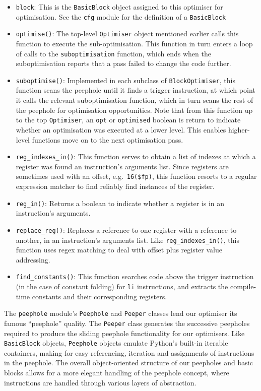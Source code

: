 \begin{itemize}
    \item \texttt{block}: This is the \texttt{BasicBlock} object assigned to
    this optimiser for optimisation. See the \texttt{cfg} module for the
    definition of a \texttt{BasicBlock}
    \item \texttt{optimise()}: The top-level \texttt{Optimiser} object mentioned
    earlier calls this function to execute the sub-optimisation. This function
    in turn enters a loop of calls to the \texttt{suboptimisation} function,
    which ends when the suboptimisation reports that a pass failed to change the
    code further.
    \item \texttt{suboptimise()}: Implemented in each subclass of
    \texttt{BlockOptimiser}, this function scans the peephole until it finds a
    trigger instruction, at which point it calls the relevant suboptimisation
    function, which in turn scans the rest of the peephole for optimisation
    opportunities. Note that from this function up to the top
    \texttt{Optimiser}, an \texttt{opt} or \texttt{optimised} boolean is return
    to indicate whether an optimisation was executed at a lower level. This
    enables higher-level functions move on to the next optimisation pass.
    \item \texttt{reg\_indexes\_in()}: This function serves to obtain a list of
    indexes at which a register was found an instruction's arguments list. Since
    registers are sometimes used with an offset, e.g.\ \texttt{16(\$fp)}, this
    function resorts to a regular expression matcher to find reliably find
    instances of the register.
    \item \texttt{reg\_in()}: Returns a boolean to indicate whether a register is
    in an instruction's arguments.
    \item \texttt{replace\_reg()}: Replaces a reference to one register with a
    reference to another, in an instruction's arguments list. Like
    \texttt{reg\_indexes\_in()}, this function uses regex matching to deal with
    offset plus register value addressing.
    \item \texttt{find\_constants()}: This function searches code above the
    trigger instruction (in the case of constant folding) for \texttt{li}
    instructions, and extracts the compile-time constants and their
    corresponding registers.
\end{itemize}


The \texttt{peephole} module's \texttt{Peephole} and \texttt{Peeper} classes
lend our optimiser its famous ``peephole'' quality. The \texttt{Peeper} class
generates the successive peepholes required to produce the sliding peephole
functionality for our optimisers. Like \texttt{BasicBlock} objects,
\texttt{Peephole} objects emulate Python's built-in iterable containers, making
for easy referencing, iteration and assignments of instructions in the peephole.
The overall object-oriented structure of our peepholes and basic blocks allows
for a more elegant handling of the peephole concept, where instructions are
handled through various layers of abstraction.\\

